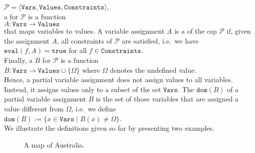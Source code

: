  $\mathcal{P} = \langle \texttt{Vars}, \texttt{Values}, \texttt{Constraints} \rangle$, 
\\[0.2cm]
a  for $\mathcal{P}$ is a function 
\\[0.2cm]
\hspace*{1.3cm}
$A: \texttt{Vars} \rightarrow \texttt{Values}$
\\[0.2cm]
that maps variables to values.  A variable assignment $A$ is a  
of the \ac{csp} $\mathcal{P}$  
if, given the assignment $A$, all constraints of $\mathcal{P}$ are satisfied, i.e.~we have
\\[0.2cm]
\hspace*{1.3cm}
$\texttt{eval}(f, A) = \texttt{true}$ \quad for all $f \in \texttt{Constraints}$.
\\[0.2cm]
Finally, a  $B$ for $\mathcal{P}$ is a function 
\\[0.2cm]
\hspace*{1.3cm}
$B: \texttt{Vars} \rightarrow \texttt{Values} \cup \{ \Omega \}$ \quad where $\Omega$ denotes the undefined value.
\\[0.2cm]
Hence, a partial variable assignment does not assign values to all variables.  Instead, it assigns values only
to a subset of the set $\texttt{Vars}$.  The  $\texttt{dom}(B)$ of a partial variable assignment $B$ is the
set of those variables that are assigned a value different from $\Omega$, i.e.~we define
\\[0.2cm]
\hspace*{1.3cm}
$\texttt{dom}(B) := \bigl\{ x \in \texttt{Vars} \mid B(x) \not= \Omega \bigr\}$.
\\[0.2cm]
We illustrate the definitions given so far by presenting two examples.


\begin{figure}[!ht]
  \centering
  \caption{A map of Australia.}
  \label{fig:australia.pdf}
\end{figure}


